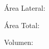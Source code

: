 \documentclass[12pt,addpoints,answers]{repaso}
\begin{document}
\begin{questions}
{\begin{multicols}{2}
\begin{parts}
                        Área Lateral: \fillin[][0in]

                        \begin{solutionbox}{1cm}
                        \end{solutionbox}

                        Área Total: \fillin[][0in]

                        \begin{solutionbox}{1cm}
                        \end{solutionbox}

                        Volumen: \fillin[][0in]

                        \begin{solutionbox}{1cm}
                        \end{solutionbox}
                  \end{parts}
            \end{multicols}
      }




\end{questions}
\end{document}
